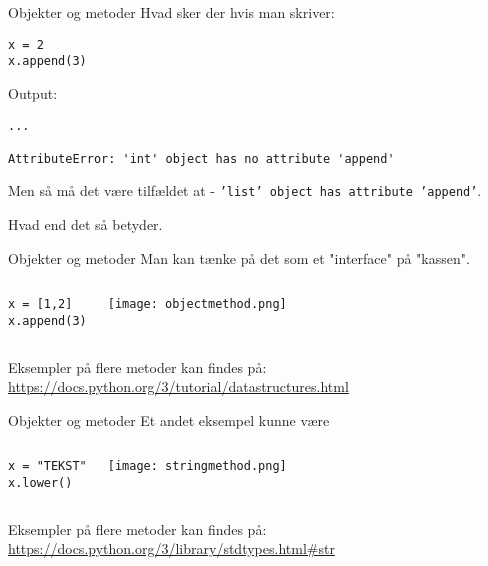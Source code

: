 \begin{frame}[fragile]{Objekter og metoder}
	Hvad sker der hvis man skriver:
	
	\begin{lstlisting}[style=python]
x = 2
x.append(3)
	\end{lstlisting}
	
	\pause
	
	Output:
	\begin{lstlisting}[style=python]
...
 
AttributeError: 'int' object has no attribute 'append'
	\end{lstlisting}
	
	\pause
	
	Men så må det være tilfældet at - \texttt{'list' object has attribute 'append'}.
	
	Hvad end det så betyder.
	
\end{frame}


\begin{frame}[fragile]{Objekter og metoder}
	Man kan tænke på det som et "interface" på "kassen".
	
	\begin{columns}
		\begin{lstlisting}[style=python]
x = [1,2]
x.append(3)
		\end{lstlisting}
		
		\texttt{[image: objectmethod.png]}
	\end{columns}
	
	Eksempler på flere metoder kan findes på: \url{https://docs.python.org/3/tutorial/datastructures.html}
\end{frame}


\begin{frame}[fragile]{Objekter og metoder}
Et andet eksempel kunne være

\begin{columns}
	\column{0.4\textwidth}
	\begin{lstlisting}[style=python]
x = "TEKST"
x.lower()
	\end{lstlisting}
	
	\column{0.4\textwidth}
	\texttt{[image: stringmethod.png]}
\end{columns}

Eksempler på flere metoder kan findes på: \url{https://docs.python.org/3/library/stdtypes.html#str}
\end{frame}




